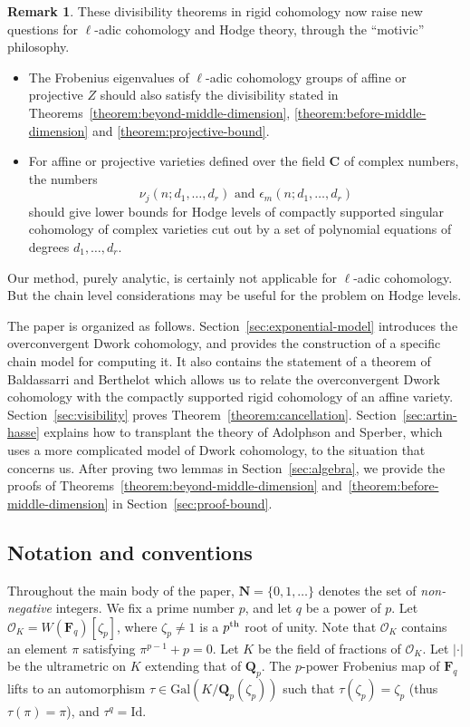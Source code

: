 \documentclass{amsart}
\numberwithin{equation}{section}
\theoremstyle{plain}
\theoremstyle{definition}
\newtheorem{remark}[equation]{Remark}
\renewcommand{\mathbb}{\mathbf}
\begin{document}
\begin{remark}
These divisibility theorems in rigid cohomology now raise new questions for \(\ell\)-adic cohomology and Hodge
theory, through the ``motivic'' philosophy.
\begin{itemize}
\item The Frobenius eigenvalues of \(\ell\)-adic cohomology groups of
affine or projective \(Z\) should also satisfy the divisibility stated
in Theorems~\ref{theorem:beyond-middle-dimension},
\ref{theorem:before-middle-dimension} and
\ref{theorem:projective-bound}.
\item For affine or projective varieties defined over the field
\(\mathbb{C}\) of complex numbers, the numbers
\[
  \nu_{j}(n;d_1,\ldots,d_r) \text{ and } \epsilon_m(n;d_1,\ldots,d_r)
\]
should give lower bounds for Hodge levels of compactly supported
singular cohomology of complex varieties cut out by a set of
polynomial equations of degrees \(d_1,\ldots,d_r\).
\end{itemize}
Our method, purely analytic, is certainly not applicable for \(\ell\)-adic
cohomology. But the chain level considerations may be useful for the
problem on Hodge levels.
\end{remark}

The paper is organized as follows.
Section~\ref{sec:exponential-model} introduces the overconvergent
Dwork cohomology, and provides the construction of a specific chain
model for computing it.  It also contains the statement of a
theorem of Baldassarri and Berthelot
\cite{baldassarri-berthelot:dwork-cohomology-for-singular-hypersurfaces}
which allows us to relate the overconvergent Dwork cohomology
with the compactly supported rigid cohomology of an affine variety.
Section~\ref{sec:visibility} proves
Theorem~\ref{theorem:cancellation}.  Section~\ref{sec:artin-hasse}
explains how to transplant the theory of Adolphson and Sperber,
which uses a more complicated model of Dwork cohomology, to
the situation that concerns us.  After proving two lemmas in
Section~\ref{sec:algebra}, we provide the proofs of
Theorems~\ref{theorem:beyond-middle-dimension}
and~\ref{theorem:before-middle-dimension} in
Section~\ref{sec:proof-bound}.


\subsection*{Notation and conventions}

Throughout the main body of the paper, \(\mathbb{N} = \{0,1,\ldots\}\)
denotes the set of \emph{non-negative} integers.  We fix a prime
number \(p\), and let \(q\) be a power of \(p\).  Let
\(\mathcal{O}_{K} = W(\mathbb{F}_{q})[\zeta_{p}]\), where
\(\zeta_{p} \neq 1\) is a \(p\textsuperscript{th}\) root of unity.
Note that \(\mathcal{O}_{K}\) contains an element \(\pi\) satisfying
\(\pi^{p-1}+p=0\).  Let \(K\) be the field of fractions of
\(\mathcal{O}_{K}\).  Let \(|\cdot|\) be the ultrametric on \(K\)
extending that of \(\mathbb{Q}_{p}\).  The \(p\)-power Frobenius map
of \(\mathbb{F}_{q}\) lifts to an automorphism
\(\tau \in \mathrm{Gal}(K/\mathbb{Q}_{p}(\zeta_{p}))\) such that
\(\tau(\zeta_{p})=\zeta_{p}\) (thus \(\tau(\pi)=\pi\)), and
\(\tau^{q}=\mathrm{Id}\).
\end{document}
